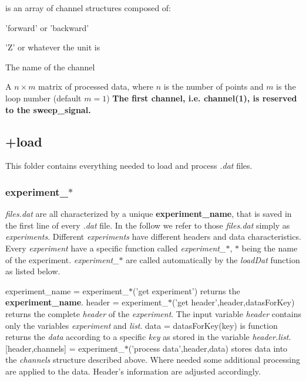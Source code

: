 \item[channels] is an array of channel structures composed of:
  \bdf
  \item[Direction] 'forward' or 'backward'
  \item[Unit] 'Z' or whatever the unit is
  \item[Name] The name of the channel
  \item[data] A $n\times m$ matrix of processed data, where $n$ is the number of points and $m$ is the loop number (default $m=1$)
  \edf
\edf
\textbf{The first channel, i.e. channel(1), is reserved to the sweep\_signal.}

\subsection{+load}
This folder contains everything needed to load and process \emph{.dat} files.
\subsubsection{experiment\_$\ast$}
\emph{files.dat} are all characterized by a unique \textbf{experiment\_name}, that is saved in the first line of every \emph{.dat} file.
In the follow we refer to those \emph{files.dat} simply as \emph{experiments}.
Different \emph{experiments} have different headers and data characteristics.
Every \emph{experiment} have a specific function called \emph{experiment\_$\ast$}, \emph{$\ast$} being the name of the experiment.
\emph{experiment\_$\ast$} are called automatically by the \emph{loadDat} function as listed below.

\bdf
\+ {experiment\_name = experiment\_$\ast$('get experiment')} returns the \textbf{experiment\_name}.
\+ {header = experiment\_$\ast$('get header',header,datasForKey)} returns the complete \emph{header} of the \emph{experiment}. 
The input variable \emph{header} contains only the variables \emph{experiment} and \emph{list}.
  \bdf
  \+ {data = datasForKey(key)} is function returns the \emph{data} according to a specific \emph{key} as stored in the variable \emph{header.list}.
  \edf  
\+ {[header,channels] = experiment\_$\ast$('process data',header,data)} stores data into the \emph{channels} structure described above. Where needed some additional processing are applied to the data. Header's information are adjusted accordingly.
\edf

